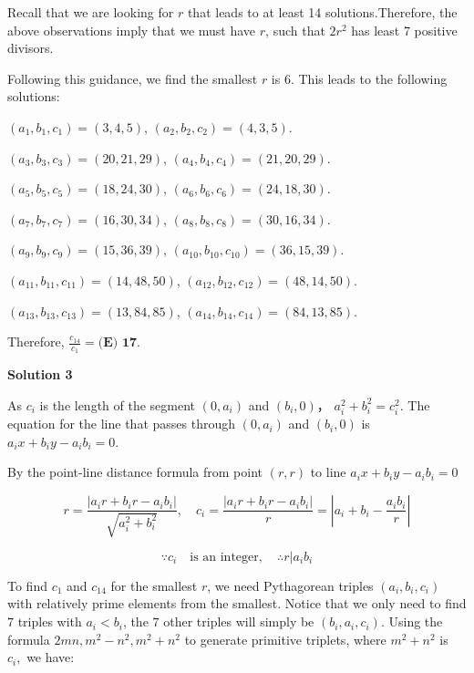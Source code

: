\begin{enumerate}
 Recall that we are looking for $r$ that leads to at least 14 solutions.Therefore, the above observations imply that we must have $r$, such that $2 r^2$ has least 7 positive divisors.

 Following this guidance, we find the smallest $r$ is 6. This leads to the following solutions:

 $\left( a_1, b_1, c_1 \right) = \left( 3, 4, 5 \right)$, $\left( a_2, b_2, c_2 \right) = \left( 4, 3, 5 \right)$.

 $\left( a_3, b_3, c_3 \right) = \left( 20, 21, 29 \right)$, $\left( a_4, b_4, c_4 \right) = \left( 21, 20, 29 \right)$.

 $\left( a_5, b_5, c_5 \right) = \left( 18, 24, 30 \right)$, $\left( a_6, b_6, c_6 \right) = \left( 24, 18, 30 \right)$.

 $\left( a_7, b_7, c_7 \right) = \left( 16, 30, 34 \right)$, $\left( a_8, b_8, c_8 \right) = \left( 30, 16, 34 \right)$.

 $\left( a_9, b_9, c_9 \right) = \left( 15, 36, 39 \right)$, $\left( a_{10}, b_{10}, c_{10} \right) = \left( 36, 15, 39 \right)$.

 $\left( a_{11}, b_{11}, c_{11} \right) = \left( 14, 48, 50 \right)$, $\left( a_{12}, b_{12}, c_{12} \right) = \left( 48, 14, 50 \right)$.

 $\left( a_{13}, b_{13}, c_{13} \right) = \left( 13, 84, 85 \right)$, $\left( a_{14}, b_{14}, c_{14} \right) = \left( 84, 13, 85 \right)$.

 Therefore, $\frac{c_{14}}{c_1} = \boxed{\textbf{(E) 17}}$.

 



\textbf{Solution 3}

As $c_i$ is the length of the segment $(0,a_i)$ and $(b_i,0)$， $a_i^2+b_i^2=c_i^2$. The equation for the line that passes through $(0,a_i)$ and $(b_i,0)$ is $a_ix+b_iy-a_ib_i=0$.

 By the point-line distance formula from point $(r,r)$ to line $a_ix+b_iy-a_ib_i=0$

 \[r = \frac{ |a_ir+b_ir-a_ib_i| }{ \sqrt{a_i^2+b_i^2} }, \quad c_i = \frac{ |a_ir+b_ir-a_ib_i| }{r} = |a_i+b_i- \frac{a_ib_i}{r}|\]

 \[\because c_i \quad \text{is an integer}, \quad \therefore r|a_ib_i\]

 To find $c_1$ and $c_{14}$ for the smallest $r$, we need Pythagorean triples $(a_i,b_i,c_i)$ with relatively prime elements from the smallest. Notice that we only need to find $7$ triples with $a_i<b_i$, the $7$ other triples will simply be $(b_i,a_i,c_i)$. Using the formula $2mn, m^2 - n^2, m^2 + n^2$ to generate primitive triplets, where $m^2 + n^2$ is $c_{i},$ we have: 


\end{enumerate}
